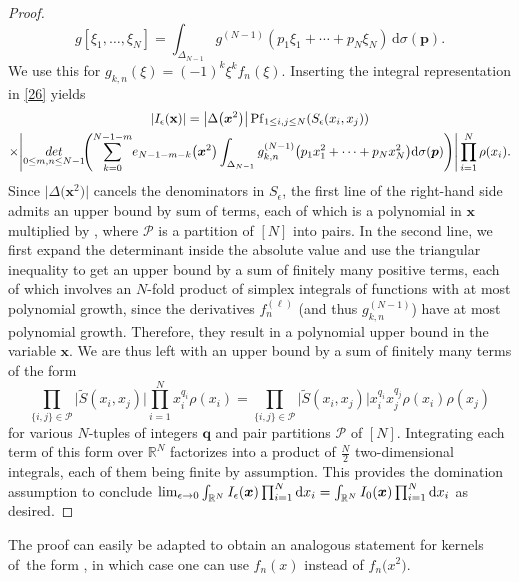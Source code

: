 \documentclass[11pt]{article}
\numberwithin{equation}{section}
\numberwithin{equation}{section}
\newcommand{\dd}{\mathrm{d}}
\begin{document}
\begin{proof}
\[
g[\xi_1,\dots,\xi_N] = \int_{\Delta_{N - 1}} g^{(N - 1)}(p_1\xi_1 + \cdots + p_N\xi_N)\,\dd \sigma(\boldsymbol{p}).
\]
We use this for $g_{k,n}(\xi) = (-1)^{k}\xi^k f_n(\xi)$. Inserting the integral representation in \eqref{26} yields
\begin{gather*}
|I_{\epsilon}(\mathbf{x})| = \bigl|\Delta\bigl(\boldsymbol{x}^2\bigr)\bigr| \operatorname{Pf}_{1 \leq i,j \leq N}(S_{\epsilon}(x_i,x_j) ) \\
 \times \Biggl| \mathop{{\rm det}}_{0 \leq m,n \leq N - 1}\!\Biggl( \sum_{k = 0}^{N - 1 - m}\! e_{N - 1 - m - k}\bigl(\boldsymbol{x}^2\bigr) \int_{\Delta_{N - 1}} g_{k,n}^{(N - 1)}\bigl(p_1x_1^2 + \cdots + p_N x_N^2\bigr) \dd \sigma(\boldsymbol{p})\Biggr)\Biggr| \prod_{i = 1}^N \rho(x_i).
\end{gather*}
Since $\bigl|\Delta\bigl(\boldsymbol{x}^2\bigr)\bigr|$ cancels the denominators in $S_{\epsilon}$, the first line of the right-hand side admits an upper bound
by sum of terms, each of which is a polynomial in $\boldsymbol{x}$ multiplied by , where $\mathcal{P}$ is a partition of $[N]$ into pairs. In the second line, we first expand the determinant inside the absolute value and use the triangular inequality to get an upper bound by a sum of finitely many positive terms, each of which involves an $N$-fold product of simplex integrals of functions with at most polynomial growth, since the derivatives $f_{n}^{(\ell)}$ \big(and thus $g_{k,n}^{(N - 1)}$\big) have at most polynomial growth. Therefore, they result in a polynomial upper bound in the variable $\boldsymbol{x}$. We are thus left with an upper bound by a sum of finitely many terms of the form
\[
\prod_{\{i,j\} \in \mathcal{P}} \bigl|\tilde{S}(x_i,x_j)\bigr| \prod_{i = 1}^{N} x_i^{q_i}\rho(x_i) = \prod_{\{i,j\} \in \mathcal{P}} \bigl|\tilde{S}(x_i,x_j)\bigr|x_i^{q_i}x_j^{q_j} \rho(x_i)\rho(x_j)
\]
for various $N$-tuples of integers $\boldsymbol{q}$ and pair partitions $\mathcal{P}$ of $[N]$. Integrating each term of this form over $\mathbb{R}^{N}$ factorizes into a product of $\frac{N}{2}$ two-dimensional integrals, each of them being finite by assumption. This provides the domination assumption to conclude $\smash{\lim_{\epsilon \rightarrow 0} \int_{\mathbb{R}^N} I_{\epsilon}(\boldsymbol{x}) \prod_{i = 1}^N \dd x_i} = \smash{\int_{\mathbb{R}^N} I_0(\boldsymbol{x}) \prod_{i = 1}^N \dd x_i}$ as desired.
\end{proof}

\begin{Remark}
\label{therem} The proof can easily be adapted to obtain an analogous statement for kernels of~the form , in which case one can use $f_n(x)$ instead of $f_n\bigl(x^2\bigr)$.
\end{Remark}
\end{document}
